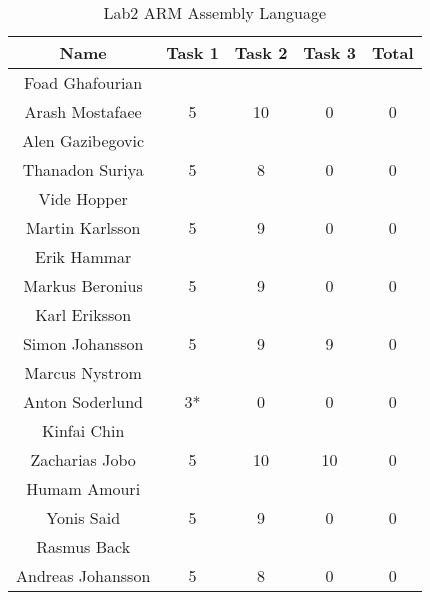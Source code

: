 \documentclass{article}
\begin{document}
\begin{table}[ht]
\caption{Lab2 ARM Assembly Language}
\centering
\begin{tabular}{c c c c c} 
\hline\hline 
Name & Task 1 & Task 2 & Task 3 & Total \\ [0.5ex] 
\hline
Foad Ghafourian \\ Arash Mostafaee 
& 5 & 10 & 0 & 0 \\
\hline
Alen Gazibegovic \\ Thanadon Suriya & 
5 & 8 & 0 & 0 \\
\hline 
Vide Hopper \\ Martin Karlsson
& 5 & 9 & 0 & 0 \\
\hline
Erik Hammar \\ Markus Beronius
& 5 & 9 & 0 & 0 \\
\hline 
Karl Eriksson \\ Simon Johansson
& 5 & 9 & 9 & 0 \\ 
\hline
Marcus Nystrom \\ Anton Soderlund
& 3* & 0 & 0 & 0 \\ 
\hline
Kinfai Chin \\ Zacharias Jobo
& 5 & 10 & 10 & 0 \\
\hline
Humam Amouri \\ Yonis Said
& 5 & 9 & 0 & 0 \\
\hline
Rasmus Back \\ Andreas Johansson
& 5 & 8 & 0 & 0 \\ [1ex]
\hline
\end{tabular}
\label{table:nonlin}
\end{table}
 



\end{document}
